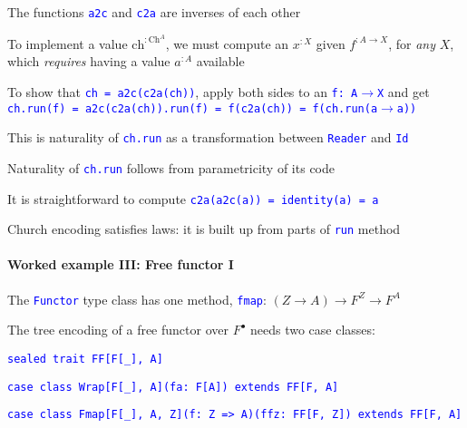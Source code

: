The functions \texttt{\textcolor{blue}{\footnotesize{}a2c}} and \texttt{\textcolor{blue}{\footnotesize{}c2a}}
are inverses of each other

To implement a value $\text{ch}^{:\text{Ch}^{A}}$, we must compute
an $x^{:X}$ given $f^{:A\rightarrow X}$, for \emph{any} $X$, which
\emph{requires} having a value $a^{:A}$ available

To show that \texttt{\textcolor{blue}{\footnotesize{}ch = a2c(c2a(ch))}},
apply both sides to an \texttt{\textcolor{blue}{\footnotesize{}f:~A$\rightarrow$X}}
and get \texttt{\textcolor{blue}{\footnotesize{}ch.run(f) = a2c(c2a(ch)).run(f)
= f(c2a(ch)) = f(ch.run(a$\rightarrow$a))}} 

This is naturality of \texttt{\textcolor{blue}{\footnotesize{}ch.run}}
as a transformation between \texttt{\textcolor{blue}{\footnotesize{}Reader}}
and \texttt{\textcolor{blue}{\footnotesize{}Id}} 

Naturality of \texttt{\textcolor{blue}{\footnotesize{}ch.run}} follows
from parametricity of its code

It is straightforward to compute \texttt{\textcolor{blue}{\footnotesize{}c2a(a2c(a))
= identity(a) = a}} 

Church encoding satisfies laws: it is built up from parts of \texttt{\textcolor{blue}{\footnotesize{}run}}
method

\paragraph{Worked example III: Free functor I}

The \texttt{\textcolor{blue}{\footnotesize{}Functor}} type class has
one method, \texttt{\textcolor{blue}{\footnotesize{}fmap}}: $\left(Z\rightarrow A\right)\rightarrow F^{Z}\rightarrow F^{A}$ 

The tree encoding of a free functor over $F^{\bullet}$ needs two
case classes:

\texttt{\textcolor{blue}{\footnotesize{}sealed trait FF{[}F{[}\_{]},
A{]}}}{\footnotesize\par}

\texttt{\textcolor{blue}{\footnotesize{}case class Wrap{[}F{[}\_{]},
A{]}(fa: F{[}A{]}) extends FF{[}F, A{]}}}{\footnotesize\par}

\texttt{\textcolor{blue}{\footnotesize{}case class Fmap{[}F{[}\_{]},
A, Z{]}(f: Z => A)(ffz: FF{[}F, Z{]}) extends FF{[}F, A{]}}}{\footnotesize\par}

